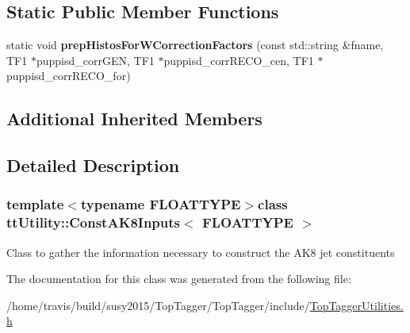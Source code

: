 \subsection*{Static Public Member Functions}
\begin{DoxyCompactItemize}
\item 
\hypertarget{classttUtility_1_1ConstAK8Inputs_aa693665ad5ea4399205db48ca5156ac8}{static void {\bfseries prep\-Histos\-For\-W\-Correction\-Factors} (const std\-::string \&fname, T\-F1 $\ast$puppisd\-\_\-corr\-G\-E\-N, T\-F1 $\ast$puppisd\-\_\-corr\-R\-E\-C\-O\-\_\-cen, T\-F1 $\ast$puppisd\-\_\-corr\-R\-E\-C\-O\-\_\-for)}\label{classttUtility_1_1ConstAK8Inputs_aa693665ad5ea4399205db48ca5156ac8}

\end{DoxyCompactItemize}
\subsection*{Additional Inherited Members}


\subsection{Detailed Description}
\subsubsection*{template$<$typename F\-L\-O\-A\-T\-T\-Y\-P\-E$>$class tt\-Utility\-::\-Const\-A\-K8\-Inputs$<$ F\-L\-O\-A\-T\-T\-Y\-P\-E $>$}

Class to gather the information necessary to construct the A\-K8 jet constituents 

The documentation for this class was generated from the following file\-:\begin{DoxyCompactItemize}
\item 
/home/travis/build/susy2015/\-Top\-Tagger/\-Top\-Tagger/include/\hyperlink{TopTaggerUtilities_8h}{Top\-Tagger\-Utilities.\-h}\end{DoxyCompactItemize}
